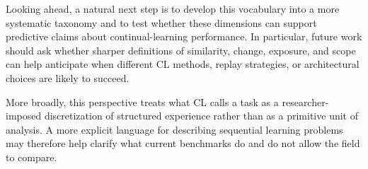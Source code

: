 \documentclass{article} %
\begin{document}
Looking ahead, a natural next step is to develop this vocabulary into a more systematic taxonomy and to test whether these dimensions can support predictive claims about continual-learning performance. In particular, future work should ask whether sharper definitions of similarity, change, exposure, and scope can help anticipate when different CL methods, replay strategies, or architectural choices are likely to succeed.


More broadly, this perspective treats what CL calls a task as a researcher-imposed discretization of structured experience rather than as a primitive unit of analysis. A more explicit language for describing sequential learning problems may therefore help clarify what current benchmarks do and do not allow the field to compare.





\end{document}
